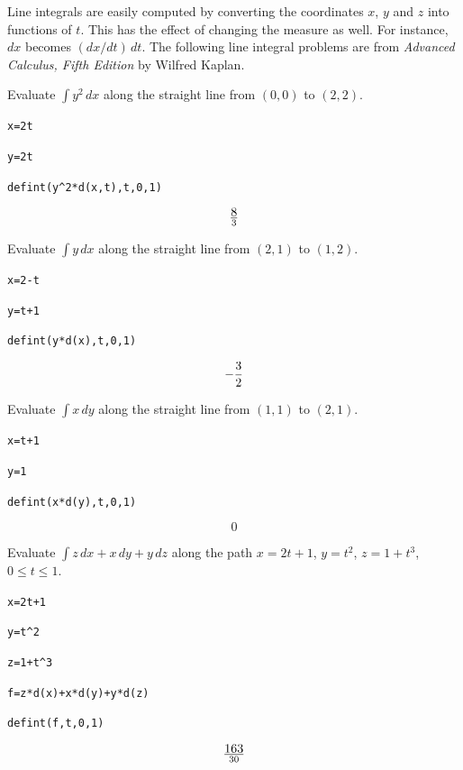 \noindent
Line integrals are easily computed by
converting the coordinates $x$, $y$ and $z$ into functions of $t$.
This has the effect of changing the measure as well.
For instance, $dx$ becomes $(dx/dt)\,dt$.
The following line integral problems are from
{\it Advanced Calculus, Fifth Edition} by Wilfred Kaplan.

\medskip
\noindent
Evaluate $\int y^2\,dx$ along the straight
line from $(0,0)$ to $(2,2)$.

\medskip
\verb$x=2t$

\verb$y=2t$

\verb$defint(y^2*d(x,t),t,0,1)$

$$8\over3$$

\medskip
\noindent
Evaluate $\int y\,dx$ along the straight line from
$(2,1)$ to $(1,2)$.

\medskip
\verb$x=2-t$

\verb$y=t+1$

\verb$defint(y*d(x),t,0,1)$

$$-{3\over2}$$

\medskip
\noindent
Evaluate $\int x\,dy$ along the straight line from
$(1,1)$ to $(2,1)$.

\medskip
\verb$x=t+1$

\verb$y=1$

\verb$defint(x*d(y),t,0,1)$

$$0$$

\medskip
\noindent
Evaluate $\int z\,dx+x\,dy+y\,dz$
along the path
$x=2t+1$, $y=t^2$, $z=1+t^3$, $0\le t\le 1$.

\medskip
\verb$x=2t+1$

\verb$y=t^2$

\verb$z=1+t^3$

\verb$f=z*d(x)+x*d(y)+y*d(z)$

\verb$defint(f,t,0,1)$

$$163\over30$$

